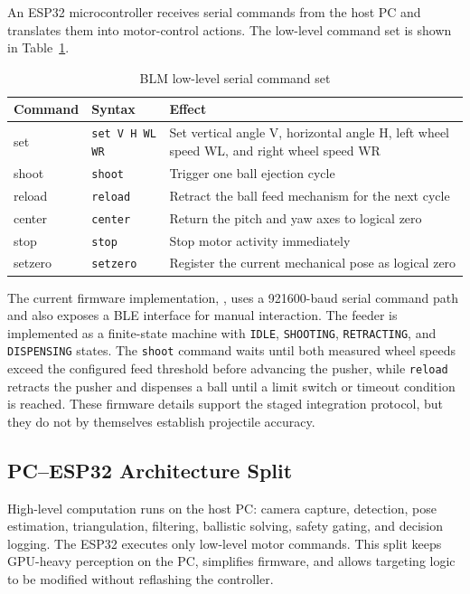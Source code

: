 An ESP32 microcontroller receives serial commands from the host PC and translates them into motor-control actions. The low-level command set is shown in Table~\ref{tab:3_2}.

\begin{table}[htbp]
\centering
\caption{BLM low-level serial command set}
\label{tab:3_2}
\begin{tabularx}{\textwidth}{|l|l|X|}
\hline
\textbf{Command} & \textbf{Syntax} & \textbf{Effect} \\
\hline
set & \texttt{set V H WL WR} & Set vertical angle V, horizontal angle H, left wheel speed WL, and right wheel speed WR \\
\hline
shoot & \texttt{shoot} & Trigger one ball ejection cycle \\
\hline
reload & \texttt{reload} & Retract the ball feed mechanism for the next cycle \\
\hline
center & \texttt{center} & Return the pitch and yaw axes to logical zero \\
\hline
stop & \texttt{stop} & Stop motor activity immediately \\
\hline
setzero & \texttt{setzero} & Register the current mechanical pose as logical zero \\
\hline
\end{tabularx}
\end{table}

The current firmware implementation, , uses a 921600-baud serial command path and also exposes a BLE interface for manual interaction. The feeder is implemented as a finite-state machine with \texttt{IDLE}, \texttt{SHOOTING}, \texttt{RETRACTING}, and \texttt{DISPENSING} states. The \texttt{shoot} command waits until both measured wheel speeds exceed the configured feed threshold before advancing the pusher, while \texttt{reload} retracts the pusher and dispenses a ball until a limit switch or timeout condition is reached. These firmware details support the staged integration protocol, but they do not by themselves establish projectile accuracy.

\subsection{PC--ESP32 Architecture Split}

High-level computation runs on the host PC: camera capture, detection, pose estimation, triangulation, filtering, ballistic solving, safety gating, and decision logging. The ESP32 executes only low-level motor commands. This split keeps GPU-heavy perception on the PC, simplifies firmware, and allows targeting logic to be modified without reflashing the controller.

